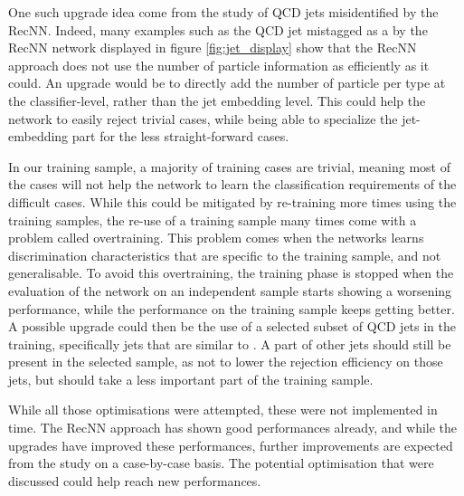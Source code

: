 One such upgrade idea come from the study of QCD jets misidentified by the RecNN. Indeed, many examples such as the QCD jet mistagged as a \tauh by the RecNN network displayed in figure \ref{fig:jet_display} show that the RecNN approach does not use the number of particle information as efficiently as it could. An upgrade would be to directly add the number of particle per type at the classifier-level, rather than the jet embedding level. This could help the network to easily reject trivial cases, while being able to specialize the jet-embedding part for the less straight-forward cases.

In our training sample, a majority of training cases are trivial, meaning most of the cases will not help the network to learn the classification requirements of the difficult cases. While this could be mitigated by re-training more times using the training samples, the re-use of a training sample many times come with a problem called overtraining. This problem comes when the networks learns discrimination characteristics that are specific to the training sample, and not generalisable. To avoid this overtraining, the training phase is stopped when the evaluation of the network on an independent sample starts showing a worsening performance, while the performance on the training sample keeps getting better. A possible upgrade could then be the use of a selected subset of QCD jets in the training, specifically jets that are similar to \tauh. A part of other jets should still be present in the selected sample, as not to lower the rejection efficiency on those jets, but should take a less important part of the training sample. 

While all those optimisations were attempted, these were not implemented in time. The RecNN approach has shown good performances already, and while the upgrades have improved these performances, further improvements are expected from the study on a case-by-case basis. The potential optimisation that were discussed could help reach new performances.


